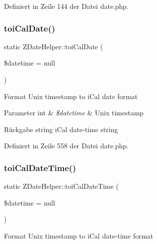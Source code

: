 Definiert in Zeile 144 der Datei date.\+php.

\mbox{\label{class_z_date_helper_aac48eb1fc2a5a8206b3c18e46f121a14}} 
\subsubsection{\texorpdfstring{toi\+Cal\+Date()}{toiCalDate()}}
{\footnotesize\ttfamily static Z\+Date\+Helper\+::toi\+Cal\+Date (\begin{DoxyParamCaption}\item[{}]{\$datetime = {\ttfamily null} }\end{DoxyParamCaption})\hspace{0.3cm}{\ttfamily [static]}}

Format Unix timestamp to i\+Cal date format


\begin{DoxyParams}[1]{Parameter}
int & {\em \$datetime} & Unix timestamp\\
\hline
\end{DoxyParams}
\begin{DoxyReturn}{Rückgabe}
string i\+Cal date-\/time string 
\end{DoxyReturn}


Definiert in Zeile 558 der Datei date.\+php.

\mbox{\label{class_z_date_helper_a128b69a45ab5b5eeedda0cd93f6a9e05}} 
\subsubsection{\texorpdfstring{toi\+Cal\+Date\+Time()}{toiCalDateTime()}}
{\footnotesize\ttfamily static Z\+Date\+Helper\+::toi\+Cal\+Date\+Time (\begin{DoxyParamCaption}\item[{}]{\$datetime = {\ttfamily null} }\end{DoxyParamCaption})\hspace{0.3cm}{\ttfamily [static]}}

Format Unix timestamp to i\+Cal date-\/time format


